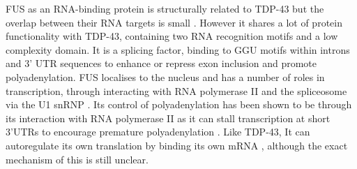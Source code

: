 FUS as an RNA-binding protein is structurally related to TDP-43 but the overlap between their RNA targets is small \citep{Lagier-Tourenne2012-wa,Rogelj2012,Colombrita2012, Honda2014}. However it shares a lot of protein functionality with TDP-43, containing two RNA recognition motifs and a low complexity domain. It is a splicing factor, binding to GGU motifs within introns and 3' UTR sequences \citep{Rogelj2012,Lagier-Tourenne2012-wa} to enhance or repress exon inclusion and promote polyadenylation. FUS localises to the nucleus and has a number of roles in transcription, through interacting with RNA polymerase II and the spliceosome via the U1 snRNP \citep{Sun2015a, Yu2015a, Yu2015b}. Its control of polyadenylation has been shown to be through its interaction with RNA polymerase II as it can stall transcription at short 3'UTRs to encourage premature polyadenylation \citep{Masuda2015}. Like TDP-43, It can autoregulate its own translation by binding its own mRNA \citep{Zhou2013}, although the exact mechanism of this is still unclear.






